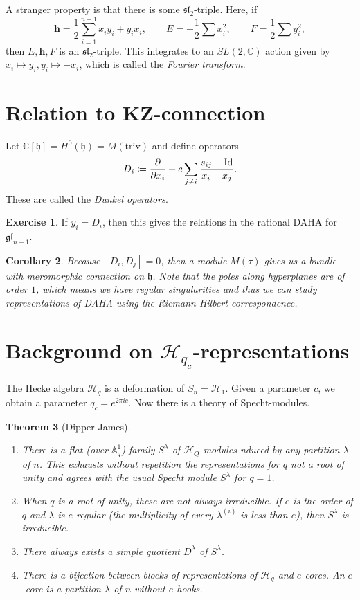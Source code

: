 \documentclass[leqno, openany]{memoir}
\newtheorem{thm}{Theorem}[section]
\newtheorem{cor}[thm]{Corollary}
\theoremstyle{definition}
\newtheorem{exer}[thm]{Exercise}
\theoremstyle{remark}
\theoremstyle{plain}
\theoremstyle{definition}
\theoremstyle{remark}
\newcommand{\A}{\mathbb{A}}
\newcommand{\C}{\mathbb{C}}
\newcommand{\h}{\mathfrak{h}}
\newcommand{\mc}[1]{\mathcal{#1}}
\newcommand{\mf}[1]{\mathfrak{#1}}
\newcommand{\mr}[1]{\mathrm{#1}}
\newcommand{\1}{\mathbf{1}}
\newcommand{\2}{\mathbf{2}}
\newcommand{\3}{\mathbf{3}}
\begin{document}
A stranger property is that there is some $\mf{sl}_2$-triple. Here, if 
\[ \mathbf{h} = \frac{1}{2} \sum_{i=1}^{n-1} x_i y_i + y_i x_i, \qquad E = -\frac{1}{2} \sum x_i^2, \qquad F = \frac{1}{2} \sum y_i^2, \]
then $E,\mathbf{h}, F$ is an $\mf{sl}_2$-triple. This integrates to an $SL(2, \C)$ action given by $x_i \mapsto y_i, y_i \mapsto -x_i$, which is called the \textit{Fourier transform}. 

\section{Relation to KZ-connection}%
\label{sec:relation_to_kz_connection}

Let $\C[\h] = H^0(\h) = M(\mr{triv})$ and define operators
\[ D_i \coloneqq \pdv{x_i} + c \sum_{j \neq i} \frac{s_{ij} - \mr{Id}}{x_i - x_j}. \]
These are called the \textit{Dunkel operators}.

\begin{exer}
    If $y_i = D_i$, then this gives the relations in the rational DAHA for $\mf{gl}_{n-1}$.
\end{exer}

\begin{cor}
    Because $[D_i, D_j] = 0$, then a module $M(\tau)$ gives us a bundle with meromorphic connection on $\h$. Note that the poles along hyperplanes are of order $1$, which means we have regular singularities and thus we can study representations of DAHA using the Riemann-Hilbert correspondence.
\end{cor}

\section{Background on $\mc{H}_{q_c}$-representations}%
\label{sec:background_on_h__q_c_representations}

The Hecke algebra $\mc{H}_q$ is a deformation of $S_n = \mc{H}_1$. Given a parameter $c$, we obtain a parameter $q_c = e^{2\pi i c}$. Now there is a theory of Specht-modules.

\begin{thm}[Dipper-James]\leavevmode
    \begin{enumerate}
        \item There is a flat (over $\A^1_q$) family $S^{\lambda}$ of $\mc{H}_Q$-modules nduced by any partition $\lambda$ of $n$. This exhausts without repetition the representations for $q$ not a root of unity and agrees with the usual Specht module $S^{\lambda}$ for $q = 1$.
        \item When $q$ is a root of unity, these are not always irreducible. If $e$ is the order of $q$ and $\lambda$ is $e$-regular (the multiplicity of every $\lambda^{(i)}$ is less than $e$), then $S^{\lambda}$ is irreducible.
        \item There always exists a simple quotient $D^{\lambda}$ of $S^{\lambda}$.
        \item There is a bijection between blocks of representations of $\mc{H}_q$ and $e$-cores. An $e$-core is a partition $\lambda$ of $n$ without $e$-hooks.
    \end{enumerate}
\end{thm}
\end{document}
